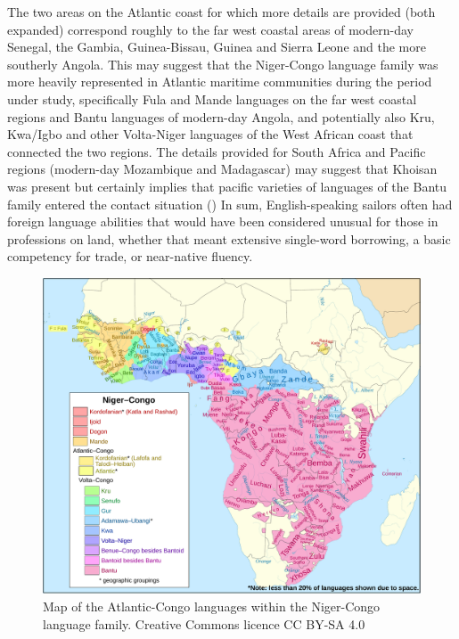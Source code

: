 The two areas on the Atlantic coast for which more details are provided (both expanded) correspond roughly to the far west coastal areas of modern-day Senegal, the Gambia, Guinea-Bissau, Guinea and Sierra Leone and the more southerly Angola. This may suggest that the Niger-Congo language family was more heavily represented in Atlantic maritime communities during the period under study, specifically Fula and Mande languages on the far west coastal regions and Bantu languages of modern-day Angola, and potentially also Kru, Kwa/Igbo and other Volta-Niger languages of the West African coast that connected the two regions. The details provided for South Africa and Pacific regions (modern-day Mozambique and Madagascar) may suggest that Khoisan was present but certainly implies that pacific varieties of languages of the Bantu family entered the  contact situation () In sum, English-speaking sailors often had foreign language abilities that would have been considered unusual for those in professions on land, whether that meant extensive single-word borrowing, a basic competency for trade, or near-native fluency. 

  
\begin{figure}

\includegraphics[width=\textwidth]{figures/img6-base.pdf}
 
\caption{\label{fig:key:3.6} Map of the Atlantic-Congo languages within the Niger-Congo language family. Creative Commons licence CC BY-SA 4.0} 
\end{figure}

